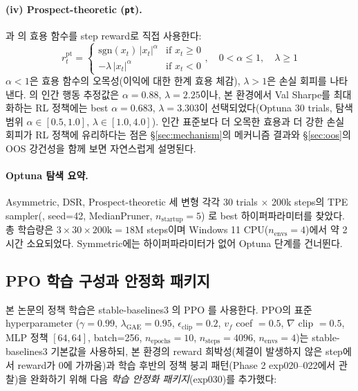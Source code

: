 \documentclass[11pt, a4paper]{article}
\begin{document}
\paragraph{(iv) Prospect-theoretic (\texttt{pt}).}
\citet{kahneman1979prospect}과 \citet{tversky1992cumulative}의 효용 함수를 step
reward로 직접 사용한다:
\begin{equation}
r_t^{\mathrm{pt}} =
\begin{cases}
\mathrm{sgn}(x_t) \, |x_t|^{\alpha} & \text{if } x_t \geq 0 \\
-\lambda \, |x_t|^{\alpha} & \text{if } x_t < 0
\end{cases}, \quad 0 < \alpha \leq 1, \quad \lambda \geq 1
\end{equation}
$\alpha < 1$은 효용 함수의 오목성(이익에 대한 한계 효용 체감), $\lambda > 1$은
손실 회피를 나타낸다. \citet{tversky1992cumulative}의 인간 행동 추정값은
$\alpha = 0.88$, $\lambda = 2.25$이나, 본 환경에서 Val Sharpe를 최대화하는 RL
정책에는 best $\alpha = 0.683$, $\lambda = 3.303$이 선택되었다(Optuna 30 trials,
탐색 범위 $\alpha \in [0.5, 1.0]$, $\lambda \in [1.0, 4.0]$). 인간 표준보다 더 오목한
효용과 더 강한 손실 회피가 RL 정책에 유리하다는 점은 \S\ref{sec:mechanism}의
메커니즘 결과와 \S\ref{sec:oos}의 OOS 강건성을 함께 보면 자연스럽게 설명된다.

\paragraph{Optuna 탐색 요약.}
Asymmetric, DSR, Prospect-theoretic 세 변형 각각 30 trials $\times$ 200k steps의
TPE sampler(\citealt{akiba2019optuna}, seed=42, MedianPruner, $n_{\text{startup}}=5$)
로 best 하이퍼파라미터를 찾았다. 총 학습량은 $3 \times 30 \times 200\text{k} =
18$M steps이며 Windows 11 CPU($n_{\text{envs}}=4$)에서 약 2시간 소요되었다. Symmetric에는
하이퍼파라미터가 없어 Optuna 단계를 건너뛴다.

\subsection{PPO 학습 구성과 안정화 패키지}
\label{sec:ppo_stab}

본 논문의 정책 학습은 stable-baselines3 \citep{raffin2021sb3}의 PPO
\citep{schulman2017ppo}를 사용한다. PPO의 표준 hyperparameter
($\gamma=0.99$, $\lambda_{\mathrm{GAE}}=0.95$, $\epsilon_{\mathrm{clip}}=0.2$,
$v_f$ coef $=0.5$, $\nabla$ clip $=0.5$, MLP 정책 $[64, 64]$, batch=256,
$n_{\text{epochs}}=10$, $n_{\text{steps}}=4096$, $n_{\text{envs}}=4$)는 stable-baselines3
기본값을 사용하되, 본 환경의 reward 희박성(체결이 발생하지 않은 step에서 reward가
0에 가까움)과 학습 후반의 정책 붕괴 패턴(Phase 2 exp020--022에서 관찰)을 완화하기
위해 다음 \emph{학습 안정화 패키지}(exp030)를 추가했다:
\end{document}
